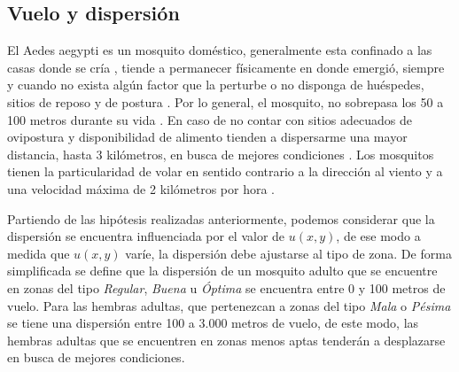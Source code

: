 
\subsection{Vuelo y dispersión}
\label{subsec:cap4-vuelo-dispersion}
El Aedes aegypti es un mosquito doméstico, generalmente esta confinado a las casas donde se
cría \cite{luevano1993ciclo}, tiende a permanecer físicamente en donde emergió, siempre y cuando
no exista algún factor que la perturbe o no disponga de huéspedes, sitios de reposo y de postura
\cite{ThironIzcazaJ2003}. Por lo general, el mosquito, no sobrepasa los 50 a 100 metros durante su
vida \cite{cabezas2005dengue}. En caso de no contar con sitios adecuados de ovipostura y
disponibilidad de alimento tienden a dispersarme una mayor distancia, hasta 3 kilómetros, en
busca de mejores condiciones \cite{ThironIzcazaJ2003}. Los mosquitos tienen la particularidad de
volar en sentido contrario a la dirección al viento \cite{ThironIzcazaJ2003,web-site:speedAnimals}
y a una velocidad máxima de 2 kilómetros por hora \cite{web-site:speedAnimals,kaufmann2004flight}.

Partiendo de las hipótesis realizadas anteriormente, podemos considerar que la dispersión se
encuentra influenciada por el valor de $u(x,y)$, de ese modo a medida que $u(x,y)$ varíe, la
dispersión debe ajustarse al tipo de zona. De forma simplificada se define que la dispersión de un
mosquito adulto que se encuentre en zonas del tipo \textit{Regular}, \textit{Buena} u
\textit{Óptima} se encuentra entre 0 y 100 metros de vuelo. Para las hembras adultas, que
pertenezcan a zonas del tipo \textit{Mala} o \textit{Pésima} se tiene una dispersión entre
100 a 3.000 metros de vuelo, de este modo, las hembras adultas que se encuentren en zonas menos
aptas tenderán a desplazarse en busca de mejores condiciones.
